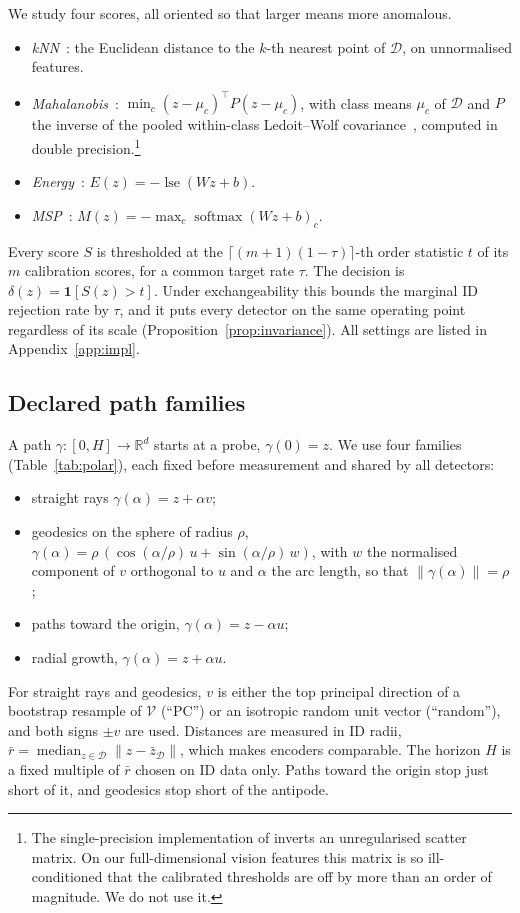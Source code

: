 \documentclass[11pt]{article}
\theoremstyle{definition}
\theoremstyle{remark}
\DeclareMathOperator{\lse}{lse}
\DeclareMathOperator{\softmax}{softmax}
\newcommand{\R}{\mathbb{R}}
\begin{document}
We study four scores, all oriented so that larger means more anomalous.
\begin{itemize}
\item \emph{kNN}~\citep{sun2022knn}: the Euclidean distance to the $k$-th nearest point of $\mathcal{D}$,
on unnormalised features.
\item \emph{Mahalanobis}~\citep{lee2018mahalanobis}: $\min_c (z-\mu_c)^\top P(z-\mu_c)$, with class
means $\mu_c$ of $\mathcal{D}$ and $P$ the inverse of the pooled within-class Ledoit--Wolf
covariance~\citep{ledoit2004}, computed in double precision.\footnote{The single-precision implementation of
\citet{kirchheim2022pytorchood} inverts an unregularised scatter matrix. On our full-dimensional vision
features this matrix is so ill-conditioned that the calibrated thresholds are off by more than an order of
magnitude. We do not use it.}
\item \emph{Energy}~\citep{liu2020energy}: $E(z)=-\lse(Wz+b)$.
\item \emph{MSP}~\citep{hendrycks2017baseline}: $M(z)=-\max_c\softmax(Wz+b)_c$.
\end{itemize}
Every score $S$ is thresholded at the $\lceil(m+1)(1-\tau)\rceil$-th order statistic $t$ of its $m$
calibration scores, for a common target rate $\tau$. The decision is $\delta(z)=\mathbf{1}[S(z)>t]$. Under
exchangeability this bounds the marginal ID rejection rate by $\tau$, and it puts every detector on the same
operating point regardless of its scale (Proposition~\ref{prop:invariance}). All settings are listed in
Appendix~\ref{app:impl}.

\subsection{Declared path families}
A path $\gamma:[0,H]\to\R^d$ starts at a probe, $\gamma(0)=z$. We use four families
(Table~\ref{tab:polar}), each fixed before measurement and shared by all detectors:
\begin{itemize}
\item straight rays $\gamma(\alpha)=z+\alpha v$;
\item geodesics on the sphere of radius $\rho$, $\gamma(\alpha)=\rho\,(\cos(\alpha/\rho)\,u+\sin(\alpha/\rho)\,w)$,
with $w$ the normalised component of $v$ orthogonal to $u$ and $\alpha$ the arc length, so that
$\|\gamma(\alpha)\|=\rho$;
\item paths toward the origin, $\gamma(\alpha)=z-\alpha u$;
\item radial growth, $\gamma(\alpha)=z+\alpha u$.
\end{itemize}
For straight rays and geodesics, $v$ is either the top principal direction of a bootstrap resample of
$\mathcal{V}$ (``PC'') or an isotropic random unit vector (``random''), and both signs $\pm v$ are used.
Distances are measured in ID radii, $\bar r=\operatorname{median}_{z\in\mathcal{D}}\|z-\bar z_{\mathcal{D}}\|$,
which makes encoders comparable. The horizon $H$ is a fixed multiple of $\bar r$ chosen on ID data only.
Paths toward the origin stop just short of it, and geodesics stop short of the antipode.
\end{document}
